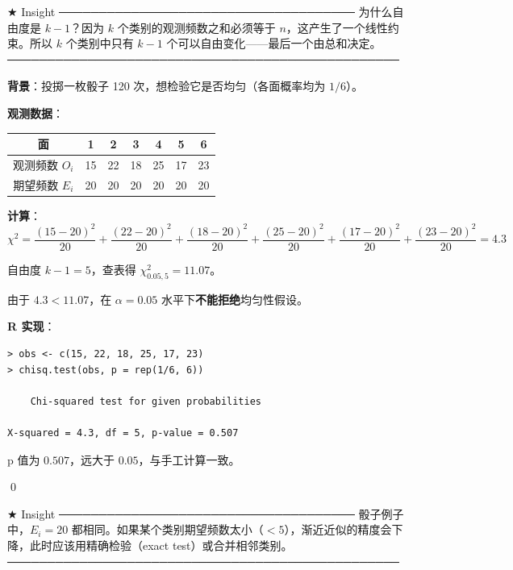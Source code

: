 ★ Insight ─────────────────────────────────────
为什么自由度是 $k-1$？因为 $k$ 个类别的观测频数之和必须等于 $n$，这产生了一个线性约束。所以 $k$ 个类别中只有 $k-1$ 个可以自由变化——最后一个由总和决定。
─────────────────────────────────────────────────

\begin{Example}\label{ex:dice-goodness-of-fit}
\textbf{背景}：投掷一枚骰子 120 次，想检验它是否均匀（各面概率均为 $1/6$）。

\textbf{观测数据}：

\begin{center}
\begin{tabular}{c|cccccc}
面 & 1 & 2 & 3 & 4 & 5 & 6\\\hline
观测频数 $O_i$ & 15 & 22 & 18 & 25 & 17 & 23\\
期望频数 $E_i$ & 20 & 20 & 20 & 20 & 20 & 20
\end{tabular}
\end{center}

\textbf{计算}：
\[
\chi^2 = \frac{(15-20)^2}{20} + \frac{(22-20)^2}{20} + \frac{(18-20)^2}{20} + \frac{(25-20)^2}{20} + \frac{(17-20)^2}{20} + \frac{(23-20)^2}{20} = 4.3
\]

自由度 $k-1 = 5$，查表得 $\chi^2_{0.05, 5} = 11.07$。

由于 $4.3 < 11.07$，在 $\alpha = 0.05$ 水平下\textbf{不能拒绝}均匀性假设。

\textbf{R 实现}：
\begin{verbatim}
> obs <- c(15, 22, 18, 25, 17, 23)
> chisq.test(obs, p = rep(1/6, 6))

    Chi-squared test for given probabilities

X-squared = 4.3, df = 5, p-value = 0.507
\end{verbatim}

p 值为 $0.507$，远大于 $0.05$，与手工计算一致。

\qed
\end{Example}

★ Insight ─────────────────────────────────────
骰子例子中，$E_i = 20$ 都相同。如果某个类别期望频数太小（$<5$），渐近近似的精度会下降，此时应该用精确检验（exact test）或合并相邻类别。
─────────────────────────────────────────────────

